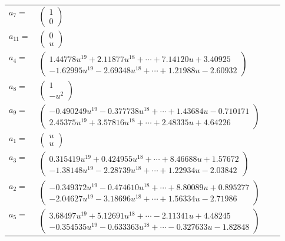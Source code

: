 \documentclass[1p]{elsarticle_modified}
\theoremstyle{definition}
\begin{document}
\begin{tabular}{m{7pt} m{180pt} m{7pt} m{180pt} }
\flushright $a_{7}=$&$\begin{pmatrix}1\\0\end{pmatrix}$ \\
\flushright $a_{11}=$&$\begin{pmatrix}0\\u\end{pmatrix}$ \\
\flushright $a_{4}=$&$\begin{pmatrix}1.44778 u^{19}+2.11877 u^{18}+\cdots+7.14120 u+3.40925\\-1.62995 u^{19}-2.69348 u^{18}+\cdots+1.21988 u-2.60932\end{pmatrix}$ \\
\flushright $a_{8}=$&$\begin{pmatrix}1\\- u^2\end{pmatrix}$ \\
\flushright $a_{9}=$&$\begin{pmatrix}-0.490249 u^{19}-0.377738 u^{18}+\cdots+1.43684 u-0.710171\\2.45375 u^{19}+3.57816 u^{18}+\cdots+2.48335 u+4.64226\end{pmatrix}$ \\
\flushright $a_{1}=$&$\begin{pmatrix}u\\u\end{pmatrix}$ \\
\flushright $a_{3}=$&$\begin{pmatrix}0.315419 u^{19}+0.424955 u^{18}+\cdots+8.46688 u+1.57672\\-1.38148 u^{19}-2.28739 u^{18}+\cdots+1.22934 u-2.03842\end{pmatrix}$ \\
\flushright $a_{2}=$&$\begin{pmatrix}-0.349372 u^{19}-0.474610 u^{18}+\cdots+8.80089 u+0.895277\\-2.04627 u^{19}-3.18696 u^{18}+\cdots+1.56334 u-2.71986\end{pmatrix}$ \\
\flushright $a_{5}=$&$\begin{pmatrix}3.68497 u^{19}+5.12691 u^{18}+\cdots-2.11341 u+4.48245\\-0.354535 u^{19}-0.633363 u^{18}+\cdots-0.327633 u-1.82848\end{pmatrix}$ \\

\end{tabular}
\end{document}

